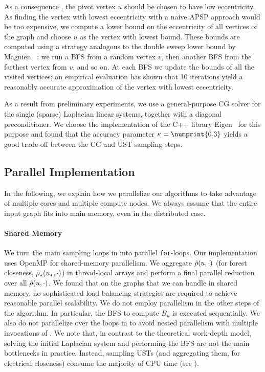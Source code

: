 As a consequence , the pivot vertex $u$ should be chosen
to have low eccentricity. As finding the vertex with lowest eccentricity with a naive APSP
approach would be too expensive, we compute a lower bound on the eccentricity of all
vertices of the graph and choose $u$ as the vertex with lowest bound.
These bounds are computed using a strategy analogous to the double sweep lower bound by
Magnien \etal~\cite{DBLP:journals/jea/MagnienLH08}: we run a BFS from a random vertex $v$, then
another BFS from the farthest vertex from $v$, and so on. At each BFS we update the bounds of
all the visited vertices; an empirical evaluation has shown that 10 iterations yield a reasonably
accurate approximation of the vertex with lowest eccentricity.

As a result from preliminary experiments, we use a general-purpose CG solver for the single
(sparse) Laplacian linear systems, together with a diagonal preconditioner. We choose the
implementation of the C++ library Eigen~\cite{eigenweb} for this purpose and found
that the accuracy parameter $\kappa = \numprint{0.3}$ yields a good trade-off between
the CG and UST sampling steps.

\subsection{Parallel Implementation}
\label{sec:el-clos:par-impl}
%
In the following, we explain how we parallelize our algorithms to take advantage of
multiple cores and multiple compute nodes. We always assume that the entire input graph fits
into main memory, even in the distributed case.

\paragraph{Shared Memory}
We turn the main sampling loops in 
into parallel \texttt{for}-loops.
Our implementation uses OpenMP for shared-memory parallelism. We aggregate
$\tilde{\rho}(u, \cdot)$ (for forest closeness, $\tilde{\rho}_{\star}(u_\star, \cdot)$)
in thread-local arrays and perform a final parallel reduction over all
$\tilde{\rho}(u, \cdot)$. We found that on the graphs that we can handle in shared
memory, no sophisticated load balancing strategies are required to achieve
reasonable parallel scalability.
We do not employ parallelism in the other steps of the algorithm. In particular, the BFS
to compute $B_u$ is executed sequentially. We also do not parallelize over the loops in
 to avoid nested parallelism with multiple invocations
of . We note that, in contrast to the theoretical work-depth
model, solving the initial Laplacian system and performing the BFS are not the main bottlenecks
in practice. Instead, sampling USTs (and aggregating them, for electrical closeness) consume
the majority of CPU time (see ).

